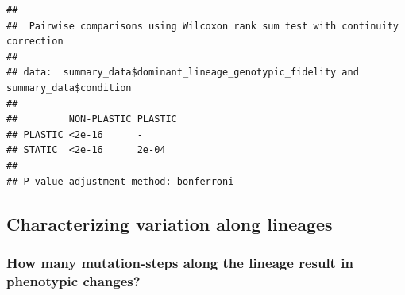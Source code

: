 \documentclass[]{book}
\newenvironment{Shaded}{\begin{snugshade}}{\end{snugshade}}
\newcommand{\DataTypeTok}[1]{\textcolor[rgb]{0.13,0.29,0.53}{#1}}
\newcommand{\DecValTok}[1]{\textcolor[rgb]{0.00,0.00,0.81}{#1}}
\newcommand{\FloatTok}[1]{\textcolor[rgb]{0.00,0.00,0.81}{#1}}
\newcommand{\KeywordTok}[1]{\textcolor[rgb]{0.13,0.29,0.53}{\textbf{#1}}}
\newcommand{\NormalTok}[1]{#1}
\newcommand{\OperatorTok}[1]{\textcolor[rgb]{0.81,0.36,0.00}{\textbf{#1}}}
\newcommand{\StringTok}[1]{\textcolor[rgb]{0.31,0.60,0.02}{#1}}
\begin{document}
\begin{verbatim}
## 
##  Pairwise comparisons using Wilcoxon rank sum test with continuity correction 
## 
## data:  summary_data$dominant_lineage_genotypic_fidelity and summary_data$condition 
## 
##         NON-PLASTIC PLASTIC
## PLASTIC <2e-16      -      
## STATIC  <2e-16      2e-04  
## 
## P value adjustment method: bonferroni
\end{verbatim}

\hypertarget{characterizing-variation-along-lineages}{%
\subsection{Characterizing variation along lineages}\label{characterizing-variation-along-lineages}}

\hypertarget{how-many-mutation-steps-along-the-lineage-result-in-phenotypic-changes}{%
\subsubsection{How many mutation-steps along the lineage result in phenotypic changes?}\label{how-many-mutation-steps-along-the-lineage-result-in-phenotypic-changes}}

\begin{Shaded}
\end{Shaded}
\end{document}
